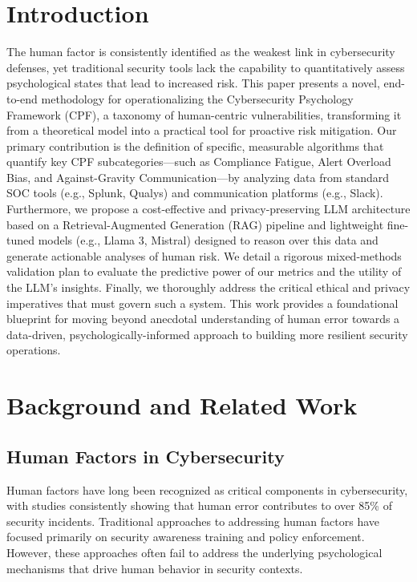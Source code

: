 \documentclass[11pt, a4paper]{article}
\begin{document}
\vspace{1cm}

\section{Introduction}
\label{sec:introduction}

The human factor is consistently identified as the weakest link in cybersecurity defenses, yet traditional security tools lack the capability to quantitatively assess psychological states that lead to increased risk. This paper presents a novel, end-to-end methodology for operationalizing the Cybersecurity Psychology Framework (CPF), a taxonomy of human-centric vulnerabilities, transforming it from a theoretical model into a practical tool for proactive risk mitigation. Our primary contribution is the definition of specific, measurable algorithms that quantify key CPF subcategories—such as Compliance Fatigue, Alert Overload Bias, and Against-Gravity Communication—by analyzing data from standard SOC tools (e.g., Splunk, Qualys) and communication platforms (e.g., Slack). Furthermore, we propose a cost-effective and privacy-preserving LLM architecture based on a Retrieval-Augmented Generation (RAG) pipeline and lightweight fine-tuned models (e.g., Llama 3, Mistral) designed to reason over this data and generate actionable analyses of human risk. We detail a rigorous mixed-methods validation plan to evaluate the predictive power of our metrics and the utility of the LLM's insights. Finally, we thoroughly address the critical ethical and privacy imperatives that must govern such a system. This work provides a foundational blueprint for moving beyond anecdotal understanding of human error towards a data-driven, psychologically-informed approach to building more resilient security operations.

\section{Background and Related Work}
\label{sec:background}

\subsection{Human Factors in Cybersecurity}
Human factors have long been recognized as critical components in cybersecurity, with studies consistently showing that human error contributes to over 85\% of security incidents. Traditional approaches to addressing human factors have focused primarily on security awareness training and policy enforcement. However, these approaches often fail to address the underlying psychological mechanisms that drive human behavior in security contexts.
\end{document}
